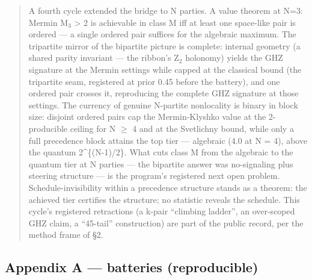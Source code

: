 \documentclass[
  11pt]{article}
\begin{document}
\begin{quote}
A fourth cycle extended the bridge to N parties. A value theorem at N=3:
Mermin M$_{3}$ \textgreater{} 2 is achievable in class M iff at least one
space-like pair is ordered --- a single ordered pair suffices for the
algebraic maximum. The tripartite mirror of the bipartite picture is
complete: internal geometry (a shared parity invariant --- the ribbon's
Z$_{2}$ holonomy) yields the GHZ signature at the Mermin settings while
capped at the classical bound (the tripartite seam, registered at prior
0.45 before the battery), and one ordered pair crosses it, reproducing
the complete GHZ signature at those settings. The currency of genuine
N-partite nonlocality is binary in block size: disjoint ordered pairs
cap the Mermin-Klyshko value at the 2-producible ceiling for N $\ge$ 4 and
at the Svetlichny bound, while only a full precedence block attains the
top tier --- algebraic (4.0 at N = 4), above the quantum
2\^{}\{(N-1)/2\}. What cuts class M from the algebraic to the quantum
tier at N parties --- the bipartite answer was no-signaling plus
steering structure --- is the program's registered next open problem.
Schedule-invisibility within a precedence structure stands as a theorem:
the achieved tier certifies the structure; no statistic reveals the
schedule. This cycle's registered retractions (a k-pair ``climbing
ladder'', an over-scoped GHZ claim, a ``45\textdegree{}-tail'' construction) are
part of the public record, per the method frame of \S2.
\end{quote}

\subsection{Appendix A --- batteries
(reproducible)}\label{appendix-a-batteries-reproducible}
\end{document}

